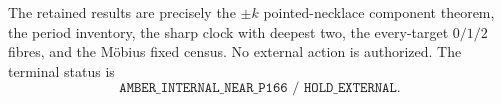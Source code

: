 \documentclass[a4paper,10pt]{amsart}
\theoremstyle{remark}
\newcommand{\1}{\mathbf 1}
\begin{document}
The retained results are precisely the
$\mathord{\pm}k$ pointed-necklace component theorem, the period inventory,
the sharp clock with deepest two, the every-target $0/1/2$ fibres, and the
M\"obius fixed census.  No external action is authorized.  The terminal
status is
\[
 \boxed{\texttt{AMBER\_INTERNAL\_NEAR\_P166 / HOLD\_EXTERNAL}}.
\]



\end{document}
